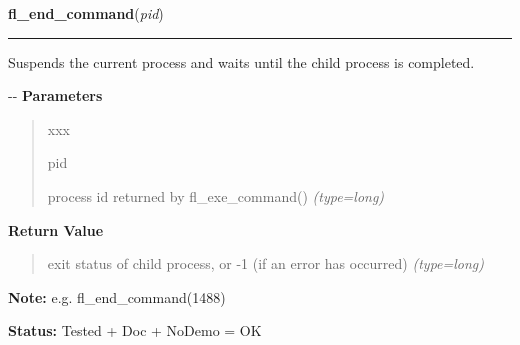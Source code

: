 \hspace{.8\funcindent}\begin{boxedminipage}{\funcwidth}

    \raggedright \textbf{fl\_end\_command}(\textit{pid})

    \vspace{-1.5ex}

    \rule{\textwidth}{0.5\fboxrule}
\setlength{\parskip}{2ex}

Suspends the current process and waits until the child process is
completed.

-{}-
\setlength{\parskip}{1ex}
      \textbf{Parameters}
      \vspace{-1ex}

      \begin{quote}
        \begin{Ventry}{xxx}

          \item[pid]


process id returned by fl\_exe\_command()
            {\it (type=long)}

        \end{Ventry}

      \end{quote}

      \textbf{Return Value}
    \vspace{-1ex}

      \begin{quote}

exit status of child process, or -1 (if an error has occurred)
      {\it (type=long)}

      \end{quote}

\textbf{Note:} 
e.g. fl\_end\_command(1488)


\textbf{Status:} 
Tested + Doc + NoDemo = OK


    \end{boxedminipage}

    \label{xformslib:flgoodies:fl_end_command}

    \vspace{0.5ex}


